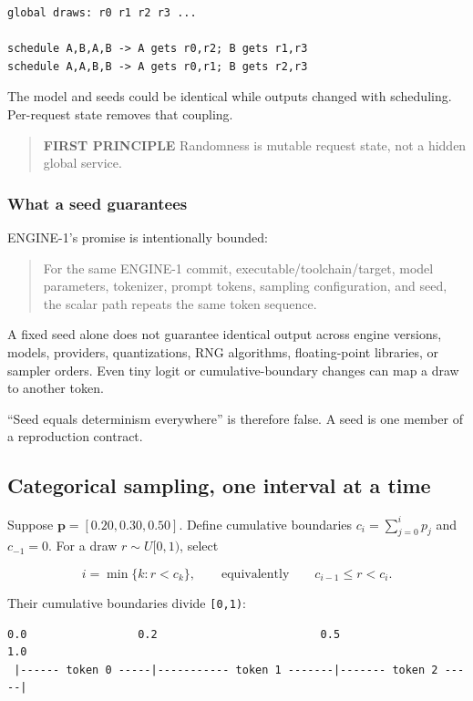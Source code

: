 \documentclass[
  10pt,
]{article}
\begin{document}
\begin{verbatim}
global draws: r0 r1 r2 r3 ...

schedule A,B,A,B -> A gets r0,r2; B gets r1,r3
schedule A,A,B,B -> A gets r0,r1; B gets r2,r3
\end{verbatim}

The model and seeds could be identical while outputs changed with
scheduling. Per-request state removes that coupling.

\begin{quote}
\textbf{FIRST PRINCIPLE} Randomness is mutable request state, not a
hidden global service.
\end{quote}

\subsubsection{What a seed guarantees}\label{what-a-seed-guarantees}

ENGINE-1's promise is intentionally bounded:

\begin{quote}
For the same ENGINE-1 commit, executable/toolchain/target, model
parameters, tokenizer, prompt tokens, sampling configuration, and seed,
the scalar path repeats the same token sequence.
\end{quote}

A fixed seed alone does not guarantee identical output across engine
versions, models, providers, quantizations, RNG algorithms,
floating-point libraries, or sampler orders. Even tiny logit or
cumulative-boundary changes can map a draw to another token.

``Seed equals determinism everywhere'' is therefore false. A seed is one
member of a reproduction contract.

\subsection{Categorical sampling, one interval at a
time}\label{categorical-sampling-one-interval-at-a-time}

Suppose \(\mathbf{p}=[0.20,0.30,0.50]\). Define cumulative boundaries
\(c_i=\sum_{j=0}^{i}p_j\) and \(c_{-1}=0\). For a draw \(r\sim U[0,1)\),
select

\[
i=\min\{k:r<c_k\},
\qquad\text{equivalently}\qquad c_{i-1}\le r<c_i.
\]

Their cumulative boundaries divide \texttt{{[}0,1)}:

\begin{verbatim}
0.0                 0.2                         0.5                    1.0
 |------ token 0 -----|----------- token 1 -------|------- token 2 -----|
\end{verbatim}
\end{document}
